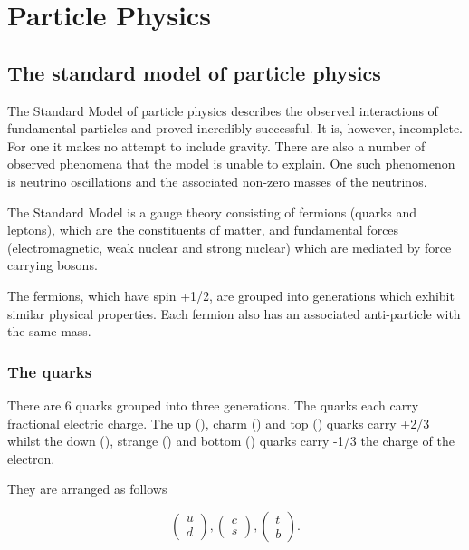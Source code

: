 \chapter{Particle Physics}
\label{chap:particle-physics}

\section{The standard model of particle physics}
\label{section:particle-physics:SM}
The Standard Model of particle physics describes the observed interactions of fundamental particles and proved incredibly successful. It is, however, incomplete. For one it makes no attempt to include gravity. There are also a number of observed phenomena that the model is unable to explain. One such phenomenon is neutrino oscillations and the associated non-zero masses of the neutrinos. 

The Standard Model is a   \CrossProduct {} gauge theory consisting of fermions (quarks and leptons), which are the constituents of matter, and fundamental forces (electromagnetic, weak nuclear and strong nuclear) which are mediated by force carrying bosons.

The fermions, which have spin +1/2, are grouped into generations which exhibit similar physical properties. Each fermion also has an associated anti-particle with the same mass. 



\subsection{The quarks}
\label{section:particle-physics:SM:quarks}

There are 6 quarks grouped into three generations. The quarks each carry fractional electric charge. The up (\Pup), charm (\Pcharm) and top (\Ptop) quarks carry +2/3 whilst the down (\Pdown), strange (\Pstrange) and bottom (\Pbottom) quarks carry -1/3 the charge of the electron.

They are arranged as follows

\begin{equation}
  \begin{pmatrix}
    u \\
    d
  \end{pmatrix}
  ,
  \begin{pmatrix}
    c \\
    s
  \end{pmatrix}
  ,
  \begin{pmatrix}
    t \\
    b
  \end{pmatrix}
.
\end{equation}

